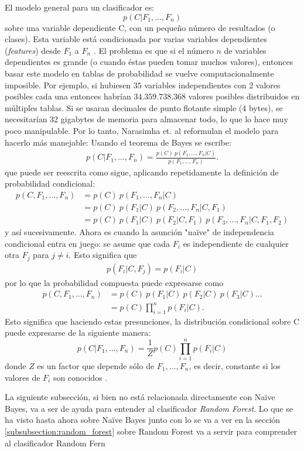 	El modelo general para un clasificador es:
		$$p(C \vert F_1,\dots,F_n)$$
	sobre una variable dependiente C, con un pequeño número de resultados (o clases). Esta variable está condicionada por varias variables dependientes (\textit{features}) desde $F_1$ a $F_n$ \cite{NarasMurty}. El problema es que si el número $n$ de variables dependientes es grande (o cuando éstas pueden tomar muchos valores), entonces basar este modelo en tablas de probabilidad se vuelve computacionalmente imposible. Por ejemplo, si hubiesen $35$ variables independientes con $2$ valores posibles cada una entonces habrían $34.359.738.368$ valores posibles distribuidos en múltiples tablas. Si se usaran decimales de punto flotante simple (4 bytes), se necesitarían 32 gigabytes de memoria para almacenar todo, lo que lo hace muy poco manipulable. Por lo tanto, Narasimha et. al reformulan el modelo para hacerlo más manejable:
Usando el teorema de Bayes se escribe:
		\begin{align*}
		p(C \vert F_1,\dots,F_n) = \frac{p(C) \ p(F_1,\dots,F_n\vert C)}{p(F_1,\dots,F_n)}.
		\end{align*}
		que puede ser reescrita como sigue, aplicando repetidamente la definición de probabilidad condicional:
		\begin{align}
		p(C, F_1, \dots, F_n)
		&= p(C) \ p(F_1,\dots,F_n\vert C) \\
		&= p(C) \ p(F_1\vert C) \ p(F_2,\dots,F_n\vert C, F_1) \\
		&= p(C) \ p(F_1\vert C) \ p(F_2\vert C, F_1) \ p(F_3,\dots,F_n\vert C, F_1, F_2)
		\end{align}
		y así sucesivamente. Ahora es cuando la asunción "na\"{i}ve" de independencia condicional entra en juego: se asume que cada $F_i$ es independiente de cualquier otra $F_j$ para $j \neq i$. Esto significa que
		\begin{align*}
		p(F_i \vert C, F_j) = p(F_i \vert C)
		\end{align*}
		por lo que la probabilidad compuesta puede expresarse como
		\begin{align*}
		p(C, F_1, \dots, F_n) 
		&= p(C) \ p(F_1\vert C) \ p(F_2\vert C) \ p(F_3\vert C) \dots \\
		&= p(C) \prod_{i=1}^n p(F_i \vert C).
		\end{align*}
		Esto significa que haciendo estas presunciones, la distribución condicional sobre C puede expresarse de la siguiente manera:
		$$p(C \vert F_1,\dots,F_n) = \frac{1}{Z}p(C)\prod_{i=1}^n p(F_i \vert C)$$
		donde $Z$ es un factor que depende sólo de $F_1,\dots , F_n$, es decir, constante si los valores de $F_i$ son conocidos \cite{NarasMurty}.
		
		La siguiente subsección, si bien no está relacionada directamente con Na\"{i}ve Bayes, va a ser de ayuda para entender al clasificador \textit{Random Forest}. Lo que se ha visto hasta ahora sobre Na\"{i}ve Bayes junto con lo se va a ver en la sección \ref{subsubsection:random_forest} sobre Random Forest va a servir para comprender al clasificador Random Fern
		